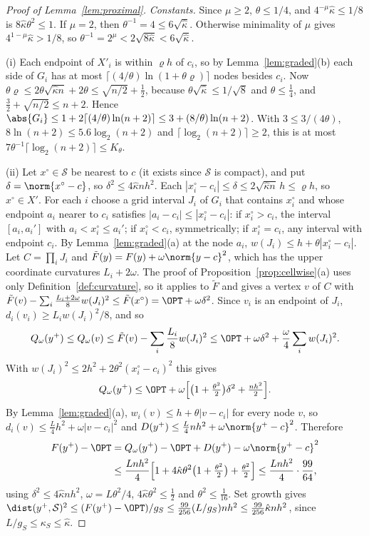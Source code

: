 \begin{proof}[Proof of Lemma~\ref{lem:proximal}]
\emph{Constants.} Since $\mu\ge2$, $\theta\le1/4$, and
$4^{-\mu}\hat\kappa\le1/8$ is $8\hat\kappa\theta^2\le1$. If $\mu=2$, then
$\theta^{-1}=4\le6\sqrt{\hat\kappa}$. Otherwise minimality of $\mu$ gives
$4^{1-\mu}\hat\kappa>1/8$, so $\theta^{-1}=2^\mu<2\sqrt{8\hat\kappa}
<6\sqrt{\hat\kappa}$.

(i) Each endpoint of $X'_i$ is within $\varrho h$ of $c_i$, so by
Lemma~\ref{lem:graded}(b) each side of $G_i$ has at most
$\lceil(4/\theta)\ln(1+\theta\varrho)\rceil$ nodes besides $c_i$. Now
$\theta\varrho\le2\theta\sqrt{\hat\kappa n}+2\theta\le\sqrt{n/2}+\frac12$,
because $\theta\sqrt{\hat\kappa}\le1/\sqrt8$ and $\theta\le\frac14$, and
$\frac32+\sqrt{n/2}\le n+2$. Hence
$\abs{G_i}\le1+2\lceil(4/\theta)\ln(n+2)\rceil\le3+(8/\theta)\ln(n+2)$. With
$3\le3/(4\theta)$, $8\ln(n+2)\le5.6\log_2(n+2)$ and
$\lceil\log_2(n+2)\rceil\ge2$, this is at most
$7\theta^{-1}\lceil\log_2(n+2)\rceil\le K_\theta$.

(ii) Let $x^\circ\in\mathcal S$ be nearest to $c$ (it exists since $\mathcal S$
is compact), and put $\delta=\norm{x^\circ-c}$, so
$\delta^2\le4\hat\kappa nh^2$. Each
$|x^\circ_i-c_i|\le\delta\le2\sqrt{\hat\kappa n}\,h\le\varrho h$, so
$x^\circ\in X'$. For each $i$ choose a grid interval $J_i$ of $G_i$ that
contains $x^\circ_i$ and
whose endpoint $a_i$ nearer to $c_i$ satisfies $|a_i-c_i|\le|x^\circ_i-c_i|$:
if $x^\circ_i>c_i$, the interval $[a_i,a_i']$ with $a_i<x^\circ_i\le a_i'$; if
$x^\circ_i<c_i$, symmetrically; if $x^\circ_i=c_i$, any interval with endpoint
$c_i$. By Lemma~\ref{lem:graded}(a) at the node $a_i$,
$w(J_i)\le h+\theta|x^\circ_i-c_i|$. Let $C=\prod_iJ_i$ and
$\tilde F(y)=F(y)+\omega\norm{y-c}^2$, which has the upper coordinate
curvatures $L_i+2\omega$. The proof of Proposition~\ref{prop:cellwise}(a) uses
only Definition~\ref{def:curvature}, so it applies to $\tilde F$ and gives a
vertex $v$ of $C$ with
$\tilde F(v)-\sum_i\frac{L_i+2\omega}8w(J_i)^2\le\tilde F(x^\circ)=\OPT+\omega\delta^2$.
Since $v_i$ is an endpoint of $J_i$, $d_i(v_i)\ge L_iw(J_i)^2/8$, and so
\[
Q_\omega(y^+)\le Q_\omega(v)\le\tilde F(v)-\sum_i\frac{L_i}8w(J_i)^2
\le\OPT+\omega\delta^2+\frac\omega4\sum_iw(J_i)^2 .
\]
With $w(J_i)^2\le2h^2+2\theta^2(x^\circ_i-c_i)^2$ this gives
\[
Q_\omega(y^+)\le\OPT+\omega\Bigl[\bigl(1+\tfrac{\theta^2}2\bigr)\delta^2
+\tfrac{nh^2}2\Bigr].
\]
By Lemma~\ref{lem:graded}(a), $w_i(v)\le h+\theta|v-c_i|$ for every node $v$,
so $d_i(v)\le\frac L4h^2+\omega|v-c_i|^2$ and
$D(y^+)\le\frac L4nh^2+\omega\norm{y^+-c}^2$. Therefore
\begin{align*}
F(y^+)-\OPT&=Q_\omega(y^+)-\OPT+D(y^+)-\omega\norm{y^+-c}^2\\
&\le\frac{Lnh^2}4\Bigl[1+4\hat\kappa\theta^2\bigl(1+\tfrac{\theta^2}2\bigr)
+\tfrac{\theta^2}2\Bigr]\le\frac{Lnh^2}4\cdot\frac{99}{64},
\end{align*}
using $\delta^2\le4\hat\kappa nh^2$, $\omega=L\theta^2/4$,
$4\hat\kappa\theta^2\le\frac12$ and $\theta^2\le\frac1{16}$. Set growth gives
$\dist(y^+,\mathcal S)^2\le(F(y^+)-\OPT)/g_S\le\frac{99}{256}(L/g_S)nh^2\le
\frac{99}{256}\hat\kappa nh^2$, since $L/g_S\le\kappa_S\le\hat\kappa$.


\end{proof}
